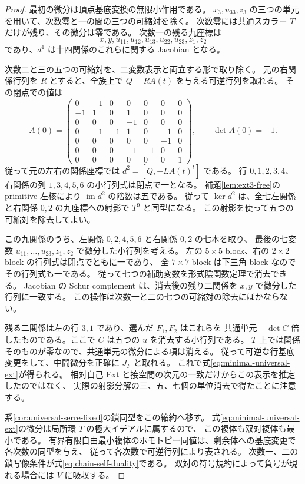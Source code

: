 \begin{proof}
最初の微分は頂点基底変換の無限小作用である。
$x_3,u_{33},z_3$ の三つの単元を用いて、次数零と一の間の三つの可縮対を除く。
次数零には共通スカラー $T$ だけが残り、その微分は零である。
次数一の残る九座標は
\[
 x,y,u_{11},u_{12},u_{13},u_{22},u_{23},z_1,z_2
\]
であり、$d^1$ は十四関係のこれらに関する Jacobian となる。

次数二と三の五つの可縮対を、二変数表示と両立する形で取り除く。
元の右関係行列を $R$ とすると、全族上で $Q=RA(t)$ を与える可逆行列を取れる。
その閉点での値は
\[
A(0)=\begin{pmatrix}
0&-1&0&0&0&0&0\\
-1&1&0&1&0&0&0\\
0&0&0&-1&0&0&0\\
0&-1&-1&1&0&-1&0\\
0&0&0&0&0&-1&0\\
0&0&0&-1&-1&0&0\\
0&0&0&0&0&0&1
\end{pmatrix},\qquad\det A(0)=-1.
\]
従って元の左右の関係座標では $d^2=[Q,-LA(t)^t]$ である。
行 $0,1,2,3,4$、右関係の列 $1,3,4,5,6$ の小行列式は閉点で一となる。
補題\ref{lem:ext3-free}の primitive 左核により $\operatorname{im}d^2$ の階数は五である。
従って $\ker d^2$ は、全七左関係と右関係 $0,2$ の九座標への射影で $T^9$ と同型になる。
この射影を使って五つの可縮対を除去してよい。

この九関係のうち、左関係 $0,2,4,5,6$ と右関係 $0,2$ の七本を取り、
最後の七変数 $u_{11},\ldots,u_{23},z_1,z_2$ で微分した小行列を考える。
左の $5\times5$ block、右の $2\times2$ block の行列式は閉点でともに一であり、
全 $7\times7$ block は下三角 block なのでその行列式も一である。
従って七つの補助変数を形式陰関数定理で消去できる。
Jacobian の Schur complement は、消去後の残り二関係を $x,y$ で微分した行列に一致する。
この操作は次数一と二の七つの可縮対の除去にほかならない。

残る二関係は左の行 $3,1$ であり、選んだ $F_1,F_2$ はこれらを
共通単元 $-\det C$ 倍したものである。ここで $C$ は五つの $u$ を消去する小行列である。
$T$ 上では関係そのものが零なので、共通単元の微分による項は消える。
従って可逆な行基底変更をして、中間微分を正確に $J_F$ と取れる。
これで式\eqref{eq:minimal-universal-ext}が得られる。
相対自己 Ext と接空間の次元の一致だけからこの表示を推定したのではなく、
実際の射影分解の三、五、七個の単位消去で得たことに注意する。

系\ref{cor:universal-serre-fixed}の鎖同型をこの縮約へ移す。
式\eqref{eq:minimal-universal-ext}の微分は局所環 $T$ の極大イデアルに属するので、
この複体も双対複体も最小である。
有界有限自由最小複体のホモトピー同値は、剰余体への基底変更で各次数の同型を与え、
従って各次数で可逆行列により表される。
次数一、二の鎖写像条件が式\eqref{eq:chain-self-duality}である。
双対の符号規約によって負号が現れる場合には $V$ に吸収する。
\end{proof}

